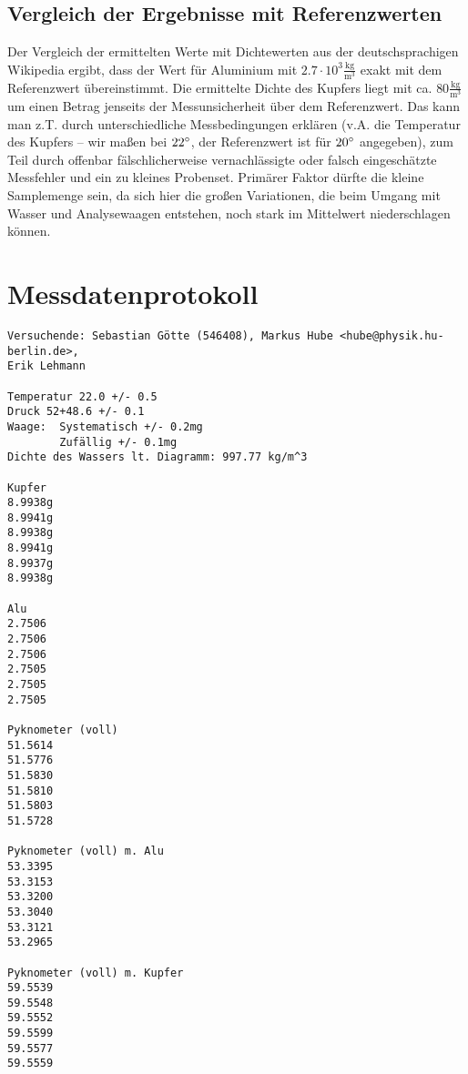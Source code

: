 \documentclass[12pt,a4paper,notitlepage]{article}
\begin{document}
\subsection{Vergleich der Ergebnisse mit Referenzwerten}
Der Vergleich der ermittelten Werte mit Dichtewerten aus der deutschsprachigen Wikipedia ergibt, dass der Wert für Aluminium mit $2.7\cdot10^3\frac{\mathrm{kg}}{\mathrm{m}^3}$ exakt mit dem Referenzwert übereinstimmt. Die ermittelte Dichte des Kupfers liegt mit ca. $80\frac{\mathrm{kg}}{\mathrm{m}^3}$ um einen Betrag jenseits der Messunsicherheit über dem Referenzwert. Das kann man z.T. durch unterschiedliche Messbedingungen erklären (v.A. die Temperatur des Kupfers -- wir maßen bei $22\degree$, der Referenzwert ist für $20\degree$ angegeben), zum Teil durch offenbar fälschlicherweise vernachlässigte oder falsch eingeschätzte Messfehler und ein zu kleines Probenset. Primärer Faktor dürfte die kleine Samplemenge sein, da sich hier die großen Variationen, die beim Umgang mit Wasser und Analysewaagen entstehen, noch stark im Mittelwert niederschlagen können.

\appendix
\section{Messdatenprotokoll}
\label{messdatenprotokoll}
\begin{verbatim}
Versuchende: Sebastian Götte (546408), Markus Hube <hube@physik.hu-berlin.de>,
Erik Lehmann 

Temperatur 22.0 +/- 0.5
Druck 52+48.6 +/- 0.1
Waage:  Systematisch +/- 0.2mg
        Zufällig +/- 0.1mg
Dichte des Wassers lt. Diagramm: 997.77 kg/m^3

Kupfer
8.9938g
8.9941g
8.9938g
8.9941g
8.9937g
8.9938g

Alu
2.7506
2.7506
2.7506
2.7505
2.7505
2.7505

Pyknometer (voll)
51.5614
51.5776
51.5830
51.5810
51.5803
51.5728

Pyknometer (voll) m. Alu
53.3395
53.3153
53.3200
53.3040
53.3121
53.2965

Pyknometer (voll) m. Kupfer
59.5539
59.5548
59.5552
59.5599
59.5577
59.5559

\end{verbatim}
\end{document}
